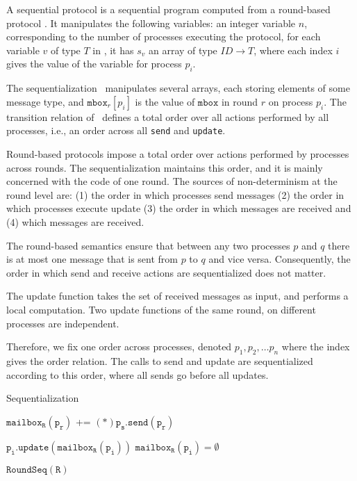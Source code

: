 A sequential protocol is a sequential program computed from a round-based protocol \Psync. It manipulates the following variables: an integer variable $n$, corresponding to the number of processes executing the protocol, for each variable $v$ of type $T$ in \Psync, it has $s_v$ an array of type $\mathit{ID} \rightarrow T$, where each index $i$ gives the value of the variable for process $p_i$.

The sequentialization \Pseq\ manipulates several arrays, each storing elements of some message type, and $\texttt{mbox}_{r}[p_i]$ is the value of $\texttt{mbox}$ in round $r$ on process $p_i$. 
The transition relation of \Pseq\ defines a total order over all actions performed by all processes, i.e., an order across all \texttt{send} and \texttt{update}.

Round-based protocols impose a total order over actions performed by processes across rounds. 
The sequentialization maintains this order, and it is mainly concerned with the code of one round. 
The sources of non-determinism at the round level are: 
(1) the order in which processes send messages 
(2) the order in which processes execute update 
(3) the order in which messages are received and
(4) which messages are received. 

The round-based semantics ensure that between any two processes $p$ and $q$ there is at most one message that is sent from $p$ to $q$ and vice versa.  
Consequently, the order in which send and receive actions are sequentialized does not matter. 

The update function takes the set of received messages as input, and performs a local computation. Two update functions of the same round, on different processes are independent.

Therefore, we fix one order across processes, denoted  $p_1, p_2, \ldots p_n$ where the index gives the order relation.
The calls to send and update are sequentialized according to this order, where all sends go before all updates. 

\begin{algorithm}[H]
\caption{Sequentialization}
\begin{algorithmic}[1]
\scriptsize

 
        \State $\mathtt{mailbox_R(p_r)}$ += $\mathtt{(*)p_s.send(p_r)}$ \label{algorithm:sequentialization:choose}
    \EndFor
\EndFor

    \State $\mathtt{p_i.update(mailbox_R(p_i))}$
    \State $\mathtt{mailbox_R(p_i)=\emptyset}$
\EndFor

 
        \State $\mathtt{RoundSeq(R)}$
    \EndFor
\EndWhile
\end{algorithmic}
\label{algorithm:sequentialization}
\end{algorithm}

